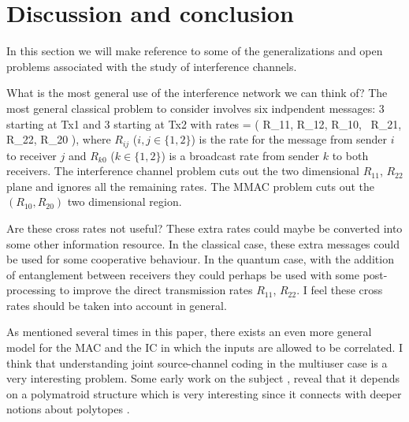 \documentclass[aps,11pt,twoside,letterpaper]{article}
\begin{document}




		

		
\section{Discussion and conclusion}		\label{section:discussion}

    In this section we will make reference to some of the generalizations and open problems
    associated with the study of interference channels.
    
    


    What is the most general use of the interference network we can think of?
    The most general classical problem to consider involves six indpendent
    messages: 3 starting at Tx1 and 3 starting at Tx2 with rates
    \be
    		=	( R_{11}, R_{12}, R_{10},  \ R_{21}, R_{22}, R_{20} ),
    \ee
    where $R_{ij}$ ($i,j \in \{1,2\}$) is the rate for the message from sender $i$
    to receiver $j$ and $R_{k0}$ ($k \in \{1,2\}$) is a broadcast rate from sender $k$
    to both receivers.
    The interference channel problem cuts out the two dimensional $R_{11}$, $R_{22}$ plane
    and ignores all the remaining rates.
    The MMAC problem cuts out the $(R_{10}, R_{20})$  two dimensional region.
    
        Are these cross rates not useful? 
        These extra rates could maybe be converted into some other information resource.
        In the classical case, these extra messages could be used for some cooperative 
        behaviour. 
	In the quantum case, with the addition of entanglement between receivers they 
	could perhaps be used with some post-processing to improve the direct
	transmission rates $R_{11}$, $R_{22}$.
        I feel these cross rates should be taken into account in general.

        
        As mentioned several times in this paper, there exists an even more general
        model for the MAC and the IC in which the inputs are allowed to be correlated.
        I think that understanding joint source-channel coding in the multiuser case
        is a very interesting problem. Some early work on the subject \cite{cover1980multiple},
        reveal that it depends on a polymatroid structure which is very interesting
        since it connects with deeper notions about polytopes \cite{E69, poly}.
        
\end{document}
